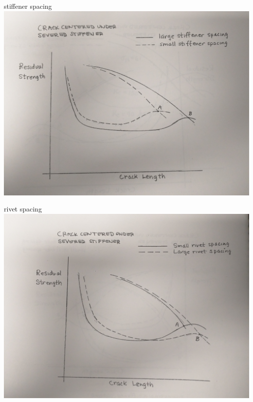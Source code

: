 \documentclass[
  letterpaper,
  ignorenonframetext,
  aspectratio=43,
  handout,
  12pt]{beamer}
\let\Oldincludegraphics\includegraphics
\renewcommand{\includegraphics}[2][]{\Oldincludegraphics[width=\textwidth,height=0.7\textheight,keepaspectratio]{#2}}
\begin{document}
\begin{frame}{stiffener spacing}
\protect\hypertarget{stiffener-spacing}{}
\includegraphics{../images/stiffener_spacing.jpg}
\end{frame}

\begin{frame}{rivet spacing}
\protect\hypertarget{rivet-spacing}{}
\includegraphics{../images/rivet_spacing.jpg}
\end{frame}
\end{document}

